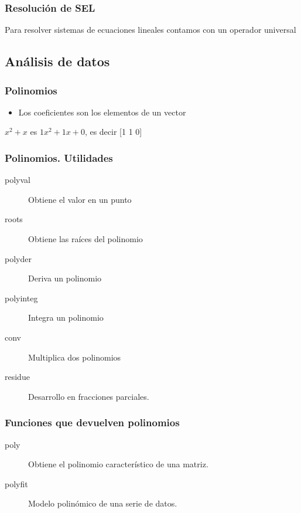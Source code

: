 \documentclass[12pt]{beamer}
\begin{document}

\begin{frame}
\frametitle{Resolución de SEL}

Para resolver sistemas de ecuaciones lineales contamos con un operador
universal
\testcode
\end{frame}

\subsection{Análisis de datos}



\begin{frame}
\frametitle{Polinomios}
\begin{itemize}
\item Los coeficientes son los elementos de un vector
\end{itemize}
$x^2 + x$ es $1x^2+1x+0$, es decir [1 1 0]
\testcode
\end{frame}

\begin{frame}
\frametitle{Polinomios. Utilidades}
\begin{description}
\item[polyval] Obtiene el valor en un punto
\item[roots] Obtiene las raíces del polinomio
\item[polyder] Deriva un polinomio
\item[polyinteg] Integra un polinomio
\item[conv] Multiplica dos polinomios
\item[residue] Desarrollo en fracciones parciales.
\end{description}
\end{frame}

\begin{frame}
\frametitle{Funciones que devuelven polinomios}
\begin{description}
\item[poly] Obtiene el polinomio característico de una matriz.
\item[polyfit] Modelo polinómico de una serie de datos.
\end{description}
\end{frame}
\end{document}
